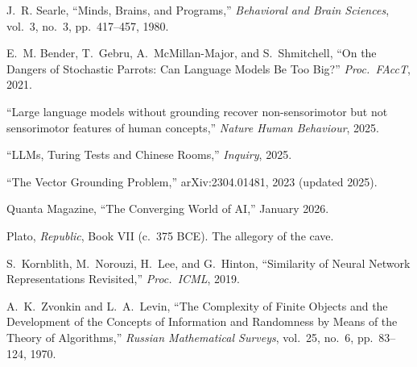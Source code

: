 \documentclass[11pt, a4paper]{article}
\begin{document}
\begin{enumerate}[leftmargin=2em, label={[\arabic*]}]
  \item J.~R. Searle, ``Minds, Brains, and Programs,'' \emph{Behavioral
    and Brain Sciences}, vol.~3, no.~3, pp.~417--457, 1980.

  \item E.~M. Bender, T.~Gebru, A.~McMillan-Major, and S.~Shmitchell,
    ``On the Dangers of Stochastic Parrots: Can Language Models Be Too
    Big?'' \emph{Proc.\ FAccT}, 2021.

  \item ``Large language models without grounding recover
    non-sensorimotor but not sensorimotor features of human concepts,''
    \emph{Nature Human Behaviour}, 2025.

  \item ``LLMs, Turing Tests and Chinese Rooms,'' \emph{Inquiry}, 2025.

  \item ``The Vector Grounding Problem,'' arXiv:2304.01481, 2023
    (updated 2025).

  \item Quanta Magazine, ``The Converging World of AI,'' January 2026.

  \item Plato, \emph{Republic}, Book VII (c.\ 375 BCE). The allegory of
    the cave.

  \item S.~Kornblith, M.~Norouzi, H.~Lee, and G.~Hinton, ``Similarity
    of Neural Network Representations Revisited,'' \emph{Proc.\ ICML},
    2019.

  \item A.~K.~Zvonkin and L.~A.~Levin, ``The Complexity of Finite
    Objects and the Development of the Concepts of Information and
    Randomness by Means of the Theory of Algorithms,''
    \emph{Russian Mathematical Surveys}, vol.~25, no.~6, pp.~83--124,
    1970.
\end{enumerate}
\end{document}
